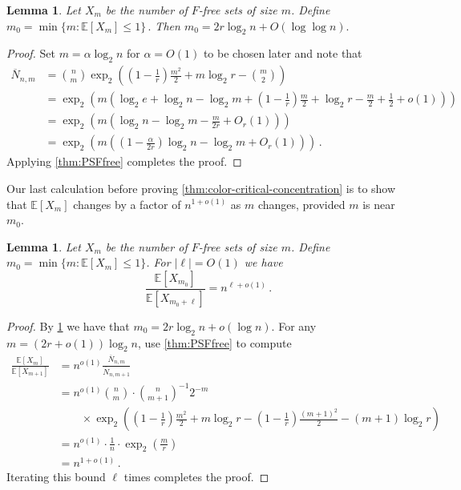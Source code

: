 \documentclass[11pt]{article}
\newtheorem{lemma}[theorem]{Lemma}
\theoremstyle{definition}
\theoremstyle{remark}
\newcommand{\E}{\mathbb{E}}
\begin{document}
\begin{lemma}\label{lem:m_0-calculation}
    Let $X_m$ be the number of $F$-free sets of size $m$.  Define $m_0 = \min\{ m : \E [X_m] \leq 1\}\,.$ Then $m_0 = 2r \log_2 n + O(\log \log n).$
\end{lemma}
\begin{proof}
    Set $m = \alpha \log_2 n$ for $\alpha = O(1)$ to be chosen later and note that \begin{align*}
        \overline{N}_{n,m} &= \binom{n}{m} \exp_2\left(\left(1 - \frac{1}{r} \right)\frac{m^2}{2} + m \log_2 r - \binom{m}{2} \right) \\
        &= \exp_2 \left(m \left(\log_2 e + \log_2 n - \log_2 m + \left(1-\frac{1}{r} \right)\frac{m}{2} + \log_2 r - \frac{m}{2} + \frac{1}{2}  + o(1) \right) \right) \\
        &= \exp_2 \left(m \left( \log_2 n - \log_2 m  -\frac{m}{2r}   + O_r(1) \right) \right) \\
        &=\exp_2 \left(m \left( \left(1- \frac{\alpha}{2r} \right)\log_2 n - \log_2 m  + O_r(1) \right) \right)\,.
    \end{align*}
    Applying \cref{thm:PSFfree} completes the proof.
\end{proof}

Our last calculation before proving \cref{thm:color-critical-concentration} is to show that $\E [X_m]$ changes by a factor of $n^{1 + o(1)}$ as $m$ changes, provided $m$ is near $m_0$. 

\begin{lemma}\label{lem:m_0-shift}
    Let $X_m$ be the number of $F$-free sets of size $m$.  Define $m_0 = \min\{ m : \E [X_m] \leq 1\}$.  For $|\ell| = O(1)$ we have 
    $$\frac{\E [X_{m_0}]}{\E [X_{m_0 + \ell}]} = n^{\ell + o(1)}\,.$$  
\end{lemma}
\begin{proof}
    By \cref{lem:m_0-calculation} we have that $m_0 = 2r \log_2 n + o(\log n).$  For any $m = (2r + o(1)) \log_2 n$, use  \cref{thm:PSFfree} to compute
    \begin{align*}\frac{\E [X_{m}]}{\E [X_{m + 1}]}  &= n^{o(1)} \frac{\overline{N}_{n,m}}{\overline{N}_{n,m+1}} \\
    &= n^{o(1)} \binom{n}{m} \cdot \binom{n}{m+1}^{-1} 2^{-m} \\
    &\qquad \times \exp_2\left(\left(1 - \frac{1}{r} \right)\frac{m^2}{2} + m \log_2 r -  \left(1 - \frac{1}{r} \right)\frac{(m+1)^2}{2} - (m+1) \log_2 r\right) \\
    &= n^{o(1)} \cdot \frac{1}{n} \cdot  \exp_2\left( \frac{m}{r} \right) \\
    &= n^{1 + o(1)} \,. 
    \end{align*}
    Iterating this bound $\ell$ times completes the proof.
\end{proof}
\end{document}
